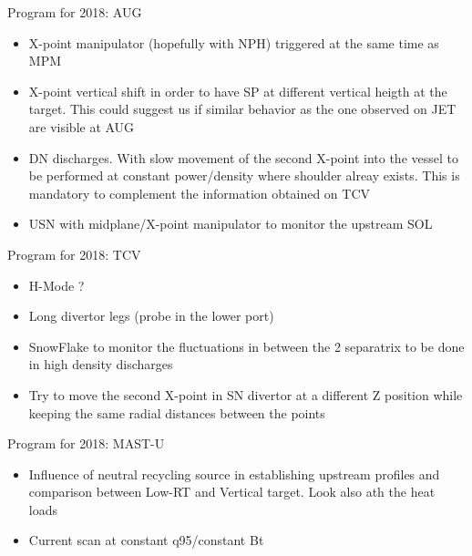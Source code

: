 \documentclass[10pt, compress]{beamer}
\begin{document}
\begin{frame}{Program for 2018: AUG}
  \begin{itemize}
     \item X-point manipulator (hopefully with NPH) triggered at
	the same time as MPM
     \item X-point vertical shift in order to have SP at different
	vertical heigth at the target. \alert{This could suggest us if
        similar behavior as the one observed on JET are visible at AUG}
     \item DN discharges. With slow movement of the second X-point into the vessel
	to be performed at constant power/density where shoulder
        alreay exists. \alert{This is mandatory to complement the
          information obtained on TCV}
     \item USN with midplane/X-point manipulator to monitor the upstream SOL 
\end{itemize}
 \end{frame}

\begin{frame}{Program for 2018: TCV}
  \begin{itemize}
     \item H-Mode ?
      \item Long divertor legs (probe in the lower port)
      \item SnowFlake to monitor the fluctuations in between the 2 separatrix
	to be done in high density discharges
       \item Try to move the second X-point in SN divertor at a different
	Z position while keeping the same radial distances between the
	points
\end{itemize}
\end{frame}

\begin{frame}{Program for 2018: MAST-U}
  \begin{itemize}
     \item Influence of neutral recycling source in establishing upstream profiles
	and comparison between Low-RT and Vertical target. Look also ath the heat
	loads
      \item Current scan at constant q95/constant Bt
      \end{itemize}
\end{frame}

\end{document}

